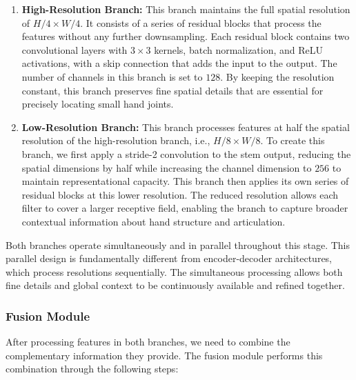 \begin{enumerate}
    \item[(a)] \textbf{High-Resolution Branch:} This branch maintains the full spatial resolution of \(H/4 \times W/4\). It consists of a series of residual blocks that process the features without any further downsampling. Each residual block contains two convolutional layers with \(3 \times 3\) kernels, batch normalization, and ReLU activations, with a skip connection that adds the input to the output. The number of channels in this branch is set to \(128\). By keeping the resolution constant, this branch preserves fine spatial details that are essential for precisely locating small hand joints.

    \item[(b)] \textbf{Low-Resolution Branch:} This branch processes features at half the spatial resolution of the high-resolution branch, i.e., \(H/8 \times W/8\). To create this branch, we first apply a stride-2 convolution to the stem output, reducing the spatial dimensions by half while increasing the channel dimension to \(256\) to maintain representational capacity. This branch then applies its own series of residual blocks at this lower resolution. The reduced resolution allows each filter to cover a larger receptive field, enabling the branch to capture broader contextual information about hand structure and articulation.
\end{enumerate}

Both branches operate simultaneously and in parallel throughout this stage. This parallel design is fundamentally different from encoder-decoder architectures, which process resolutions sequentially. The simultaneous processing allows both fine details and global context to be continuously available and refined together.

\subsubsection{Fusion Module}
After processing features in both branches, we need to combine the complementary information they provide. The fusion module performs this combination through the following steps:

